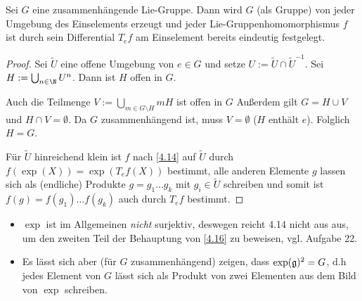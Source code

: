 \begin{st} \label{4.16}
    Sei $G$ eine zusammenhängende Lie-Gruppe.
    Dann wird $G$ (als Gruppe) von jeder Umgebung des Einselements erzeugt und jeder Lie-Gruppenhomomorphismus $f$ ist durch sein Differential $T_e f$ am Einselement bereits eindeutig festgelegt.
    \begin{proof}
        Sei $\tilde U$ eine offene Umgebung von $e \in G$ und setze $U:= \tilde U \cap {\tilde U}^{-1}$.
        Sei $H := \bigcup_{n \in \N} U^n$.
        Dann ist $H$ offen in $G$.

        Auch die Teilmenge $V := \bigcup_{m \in G \setminus H} mH$ ist offen in $G$
        Außerdem gilt $G = H \cup V$ und $H \cap V = \emptyset$.
        Da $G$ zusammenhängend ist, muss $V = \emptyset$ ($H$ enthält $e$).
        Folglich $H = G$.

        Für $\tilde U$ hinreichend klein ist $f$ nach \ref{4.14} auf $\tilde U$ durch $f(\exp(X)) = \exp(T_e f(X))$ bestimmt, alle anderen Elemente $g$ lassen sich als (endliche) Produkte $g = g_1 \dotsc g_k$ mit $g_i \in \tilde U$ schreiben und somit ist $f(g) = f(g_1) \dotsc f(g_k)$ auch durch $T_e f$ bestimmt.
    \end{proof}
\end{st}

\begin{note}
    \begin{itemize}
        \item
            $\exp$ ist im Allgemeinen \emph{nicht} surjektiv, deswegen reicht 4.14 nicht aus aus, um den zweiten Teil der Behauptung von \ref{4.16} zu beweisen, vgl. Aufgabe 22.
        \item
            Es lässt sich aber (für $G$ zusammenhängend) zeigen, dass $\exp(\mathfrak{g})^2 = G$, d.h jedes Element von $G$ lässt sich als Produkt von zwei Elementen aus dem Bild von $\exp$ schreiben.
    \end{itemize}
\end{note}

